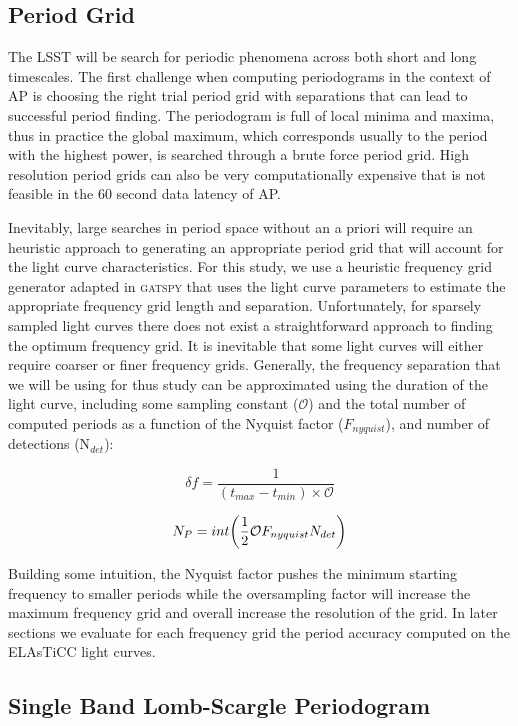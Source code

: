 \documentclass[DM,authoryear,toc]{lsstdoc}
\begin{document}
\subsection{Period Grid}
The LSST will be search for periodic phenomena across both short and long timescales. The first challenge when computing periodograms in the context of AP is choosing the right trial period grid with separations that can lead to successful period finding. The periodogram is full of local minima and maxima, thus in practice the global maximum, which corresponds usually to the period with the highest power, is searched through a brute force period grid. High resolution period grids can also be very computationally expensive that is not feasible in the 60 second data latency of AP. 

Inevitably, large searches in period space without an a priori will require an heuristic approach to generating an appropriate period grid that will account for the light curve characteristics. For this study, we use a heuristic frequency grid generator adapted in \textsc{gatspy} that uses the light curve parameters to estimate the appropriate frequency grid length and separation. Unfortunately, for sparsely sampled light curves there does not exist a straightforward approach to finding the optimum frequency grid. It is inevitable that some light curves will either require coarser or finer frequency grids. 
Generally, the frequency separation that we will be using for thus study can be approximated using the duration of the light curve, including some sampling constant ($\mathcal{O}$) and the total number of computed periods as a function of the Nyquist factor ($F_{nyquist}$), and number of detections (N$_{det}$): 

\begin{equation}
\delta f = \frac{1}{(t_{max} - t_{min}) \times \mathcal{O}}
\end{equation}

\begin{equation}
N_{P} = int \bigg{(} \frac{1}{2} \mathcal{O} F_{nyquist} N_{det} \bigg{)}
\end{equation}

Building some intuition, the Nyquist factor pushes the minimum starting frequency to smaller periods while the oversampling factor will increase the maximum frequency grid and overall increase the resolution of the grid. In later sections we evaluate for each frequency grid the period accuracy computed on the ELAsTiCC light curves. 

\subsection{Single Band Lomb-Scargle Periodogram}
\end{document}
